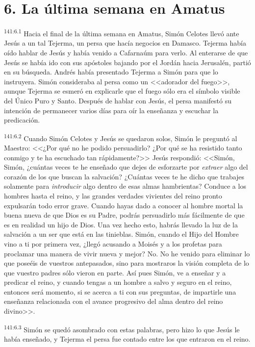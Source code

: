 \section*{6. La última semana en Amatus}
\par 
\textsuperscript{141:6.1} Hacia el final de la última semana en Amatus, Simón Celotes llevó ante Jesús a un tal Tejerma, un persa que hacía negocios en Damasco. Tejerma había oído hablar de Jesús y había venido a Cafarnaúm para verlo. Al enterarse de que Jesús se había ido con sus apóstoles bajando por el Jordán hacia Jerusalén, partió en su búsqueda. Andrés había presentado Tejerma a Simón para que lo instruyera. Simón consideraba al persa como un <<adorador del fuego>>, aunque Tejerma se esmeró en explicarle que el fuego sólo era el símbolo visible del Único Puro y Santo. Después de hablar con Jesús, el persa manifestó su intención de permanecer varios días para oír la enseñanza y escuchar la predicación.

\par 
\textsuperscript{141:6.2} Cuando Simón Celotes y Jesús se quedaron solos, Simón le preguntó al Maestro: <<¿Por qué no he podido persuadirlo? ¿Por qué se ha resistido tanto conmigo y te ha escuchado tan rápidamente?>> Jesús respondió: <<Simón, Simón, ¿cuántas veces te he enseñado que dejes de esforzarte por \textit{extraer} algo del corazón de los que buscan la salvación? ¿Cuántas veces te he dicho que trabajes solamente para \textit{introducir} algo dentro de esas almas hambrientas? Conduce a los hombres hasta el reino, y las grandes verdades vivientes del reino pronto expulsarán todo error grave. Cuando hayas dado a conocer al hombre mortal la buena nueva de que Dios es su Padre, podrás persuadirlo más fácilmente de que es en realidad un hijo de Dios. Una vez hecho esto, habrás llevado la luz de la salvación a un ser que está en las tinieblas. Simón, cuando el Hijo del Hombre vino a ti por primera vez, ¿llegó acusando a Moisés y a los profetas para proclamar una manera de vivir nueva y mejor? No. No he venido para eliminar lo que poseéis de vuestros antepasados, sino para mostraros la visión completa de lo que vuestro padres sólo vieron en parte. Así pues Simón, ve a enseñar y a predicar el reino, y cuando tengas a un hombre a salvo y seguro en el reino, entonces será momento, si se acerca a ti con sus preguntas, de impartirle una enseñanza relacionada con el avance progresivo del alma dentro del reino divino>>.

\par 
\textsuperscript{141:6.3} Simón se quedó asombrado con estas palabras, pero hizo lo que Jesús le había enseñado, y Tejerma el persa fue contado entre los que entraron en el reino.

